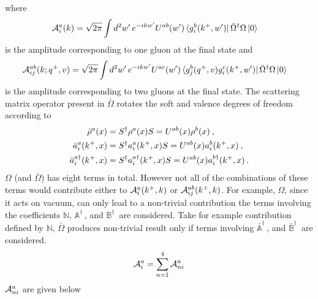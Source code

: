 \documentclass[10pt]{article}
\def\mf#1{\mathbb{#1}}
\numberwithin{equation}{section}
\begin{document}
where \begin{align}
    {\cal A}^{a}_{i}(k) & = \sqrt{2\pi} \int d^{2}w^\prime\,e^{-ikw^\prime} U^{ab}(w^\prime)\bra{g^{b}_{i}(k^{+},w^\prime)}\Bar{\Omega}^{\dagger}\Omega\ket{0}
\end{align}
is the amplitude corresponding to one gluon at the final state and 
\begin{align}
     {\cal A}^{ab}_{ij}(k; q^+, v) & = \sqrt{2\pi} \int d^{2} w^{\prime}\,  e^{-ikw^\prime} U^{ac}(w^\prime)\bra{g^{b}_{j}(q^{+},v)g^{c}_{i}(k^{+},w^\prime)}\Bar{\Omega}^{\dagger}\Omega\ket{0}
\end{align}
 is the amplitude corresponding to two gluons at the final state. 
The scattering matrix operator present in $\bar \Omega$ rotates the soft and valence degrees of freedom according to  
\begin{align}
    \bar \rho^a(x)  &= S^\dagger  \rho^a(x) S 
    = U^{a b}(x)  \rho^b(x) \:, \notag  \\ 
    \bar a_i^a(k^+, x)  &= S^\dagger a_i^{a}(k^+,x) S 
    = U^{a b}(x)  a_i^b(k^+,x) \:, \notag  \\
    \bar a_i^{a\dagger}(k^+,x)  &= S^\dagger a_i^{a\dagger}(k^+,x) S 
    = U^{a b}(x)  a_i^{b\dagger}(k^+, x) \,. 
\end{align}
$\Omega$ (and $\bar \Omega$) has eight terms in total. 
However not all of the combinations of these terms would contribute either to  $  {\cal A}_i^a (k^+, k) $ or ${\cal A}^{ab}_{ij}(k^{+},k)$.  For example, $\Omega$, since it acts on vacuum, can only lead to a non-trivial contribution the terms involving the coefficients $\mf{N}$, $\mf{A}^\dagger\,$, and $\mf{B}^\dagger\,$ are considered.  
Take for example contribution defined by $\mf{N}$, $\bar \Omega$ produces non-trivial result only if terms involving $\bar {\mf{A}}^\dagger\,$, and $\bar {\mf{B}}^\dagger\,$ are considered. 
\begin{align}
    {\cal A}^{a}_i = \sum_{n=1}^4 {\cal A}^{a}_{n i} 
\end{align}
${\cal A}^{a}_{n i}$ are given below  
\end{document}
